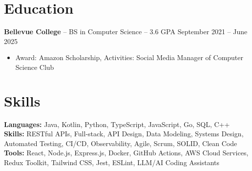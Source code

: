 \documentclass[11pt]{article}       %
\begin{document}

\vspace{-18.5pt}

\section*{Education}
\textbf{Bellevue College} -- BS in Computer Science -- 3.6 GPA \hfill September 2021 -- June 2025\\
\vspace{-9pt}
\begin{itemize}
  \item Award: Amazon Scholarship, Activities: Social Media Manager of Computer Science Club
\end{itemize}

\vspace{-18.5pt}

\section*{Skills}
\textbf{Languages:} Java, Kotlin, Python, TypeScript, JavaScript, Go, SQL, C++\\
\textbf{Skills:} RESTful APIs, Full-stack, API Design, Data Modeling, Systems Design, Automated Testing, CI/CD, Observability, Agile, Scrum, SOLID, Clean Code\\
\textbf{Tools:} React, Node.js, Express.js, Docker, GitHub Actions, AWS Cloud Services, Redux Toolkit, Tailwind CSS, Jest, ESLint, LLM/AI Coding Assistants\\

\vspace{-6.5pt}
\end{document}
